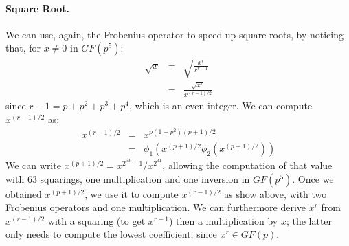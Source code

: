 \documentclass{llncs}
\newcommand{\GF}{GF}
\begin{document}
\paragraph{Square Root.} We can use, again, the Frobenius operator to
speed up square roots, by noticing that, for $x\neq 0$ in $\GF(p^5)$:
\begin{eqnarray*}
    \sqrt{x} &=& \sqrt{\frac{x^r}{x^{r-1}}} \\
             &=& \frac{\sqrt{x^r}}{x^{(r-1)/2}}
\end{eqnarray*}
since $r - 1 = p + p^2 + p^3 + p^4$, which is an even integer. We can
compute $x^{(r-1)/2}$ as:
\begin{eqnarray*}
    x^{(r-1)/2} &=& x^{p(1 + p^2)(p + 1)/2} \\
                &=& \phi_1( x^{(p+1)/2} \phi_2( x^{(p+1)/2} ))
\end{eqnarray*}
We can write $x^{(p+1)/2} = x^{2^{63} + 1} / x^{2^{31}}$, allowing the
computation of that value with 63 squarings, one multiplication and one
inversion in $\GF(p^5)$. Once we obtained $x^{(p+1)/2}$, we use it to
compute $x^{(r-1)/2}$ as show above, with two Frobenius operators and
one multiplication. We can furthermore derive $x^r$ from $x^{(r-1)/2}$
with a squaring (to get $x^{r-1}$) then a multiplication by $x$; the
latter only needs to compute the lowest coefficient, since $x^r \in
\GF(p)$.
\end{document}
